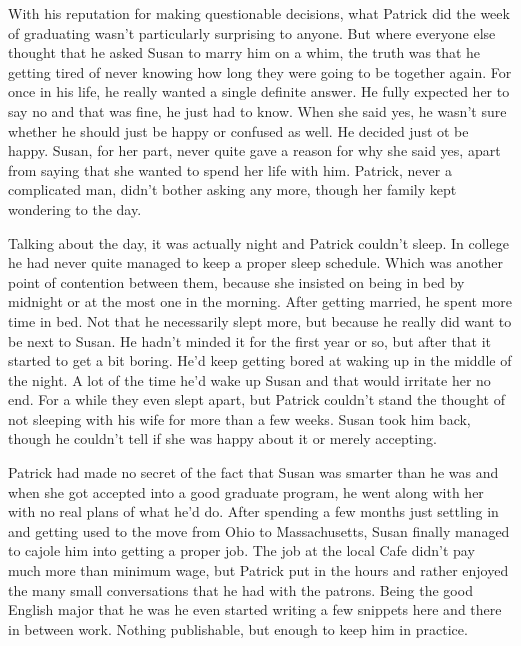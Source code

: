 \documentclass[11pt,letterpaper]{article}
\begin{document}
With his reputation for making questionable decisions, what Patrick did the week of graduating wasn't particularly surprising to anyone. But where everyone else thought that he asked Susan to marry him on a whim, the truth was that he getting tired of never knowing how long they were going to be together again. For once in his life, he really wanted a single definite answer. He fully expected her to say no and that was fine, he just had to know. When she said yes, he wasn't sure whether he should just be happy or confused as well. He decided just ot be happy. Susan, for her part, never quite gave a reason for why she said yes, apart from saying that she wanted to spend her life with him. Patrick, never a complicated man, didn't bother asking any more, though her family kept wondering to the day.

Talking about the day, it was actually night and Patrick couldn't sleep. In college he had never quite managed to keep a proper sleep schedule. Which was another point of contention between them, because she insisted on being in bed by midnight or at the most one in the morning. After getting married, he spent more time in bed. Not that he necessarily slept more, but because he really did want to be next to Susan. He hadn't minded it for the first year or so, but after that it started to get a bit boring. He'd keep getting bored at waking up in the middle of the night. A lot of the time he'd wake up Susan and that would irritate her no end. For a while they even slept apart, but Patrick couldn't stand the thought of not sleeping with his wife for more than a few weeks. Susan took him back, though he couldn't tell if she was happy about it or merely accepting.

Patrick had made no secret of the fact that Susan was smarter than he was and when she got accepted into a good graduate program, he went along with her with no real plans of what he'd do. After spending a few months just settling in and getting used to the move from Ohio to Massachusetts, Susan finally managed to cajole him into getting a proper job. The job at the local Cafe didn't pay much more than minimum wage, but Patrick put in the hours and rather enjoyed the many small conversations that he had with the patrons. Being the good English major that he was he even started writing a few snippets here and there in between work. Nothing publishable, but enough to keep him in practice.
\end{document}
